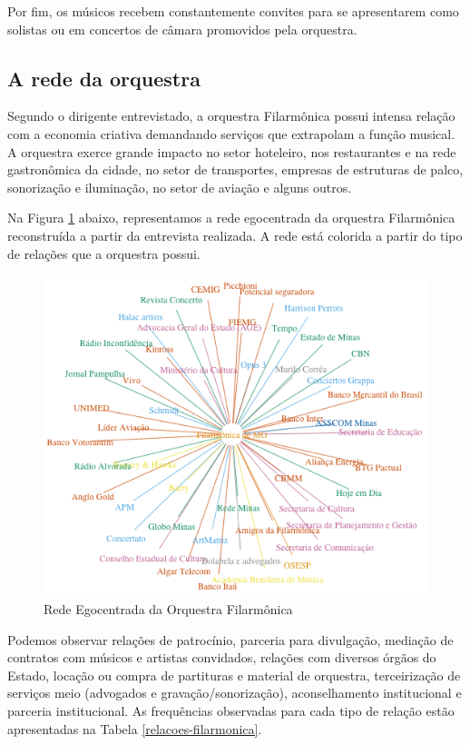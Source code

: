 \documentclass[a4paper, 12pt, openright, oneside, german, french, english, brazil]{abntex2}
\begin{document}
	Por fim, os músicos recebem constantemente convites para se apresentarem como solistas ou em concertos de câmara promovidos pela orquestra.
	
	
	\subsection{A rede da orquestra}
	
	Segundo o dirigente entrevistado, a orquestra Filarmônica possui intensa relação com a economia criativa demandando serviços que extrapolam a função musical. A orquestra exerce grande impacto no setor hoteleiro, nos restaurantes e na rede gastronômica da cidade, no setor de transportes, empresas de estruturas de palco, sonorização e iluminação, no setor de aviação e alguns outros.
	
	Na Figura \ref{rede-filarmonica} abaixo, representamos a rede egocentrada da orquestra Filarmônica reconstruída a partir da entrevista realizada. A rede está colorida a partir do tipo de relações que a orquestra possui.
	
	\begin{figure}[!ht]
		\centering
		\caption{Rede Egocentrada da Orquestra Filarmônica}
		\label{rede-filarmonica}
		\includegraphics[scale=.7]{rede_filarmonica.png}
	\end{figure}
	
	Podemos observar relações de patrocínio, parceria para divulgação, mediação de contratos com músicos e artistas convidados, relações com diversos órgãos do Estado, locação ou compra de partituras e material de orquestra, terceirização de serviços meio (advogados e gravação/sonorização), aconselhamento institucional e parceria institucional. As frequências observadas para cada tipo de relação estão apresentadas na Tabela \ref{relacoes-filarmonica}. 
	
\end{document}
